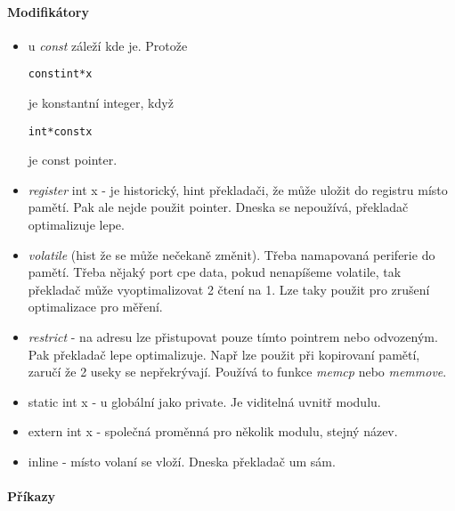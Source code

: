 \paragraph{Modifikátory}
\begin{itemize}
	\item u \emph{const} záleží kde je. Protože

	\begin{alltt}
		const int *x
	\end{alltt}
		je konstantní integer, když
	\begin{alltt}
		int * const x
	\end{alltt}
		je const pointer.
	\item \emph{register} int x - je historický, hint překladači, že může uložit do registru místo pamětí.
		Pak ale nejde použit pointer. Dneska se nepoužívá, překladač optimalizuje lepe.
	\item \emph{volatile} (hist že se může nečekaně změnit). Třeba namapovaná periferie do pamětí.
		Třeba nějaký port cpe data, pokud nenapíšeme volatile, tak překladač může vyoptimalizovat 2 čtení na 1.
		Lze taky použit pro zrušení optimalizace pro měření.
	\item \emph{restrict} - na adresu lze přistupovat pouze tímto pointrem nebo odvozeným.
		Pak překladač lepe optimalizuje. Např lze použit při kopirovaní pamětí, zaručí že 2 useky se nepřekrývají.
		Používá to funkce \emph{memcp} nebo \emph{memmove}.
	\item static int x - u globální jako private. Je viditelná uvnitř modulu.
	\item extern int x - společná proměnná pro několik modulu, stejný název.
	\item inline - místo volaní se vloží. Dneska překladač um sám.
\end{itemize}

\paragraph{Příkazy}

